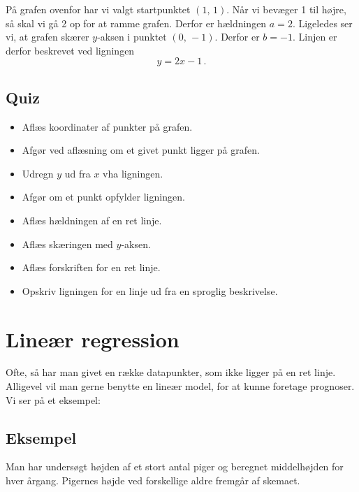 \documentclass[12pt,oneside,a4paper]{article}
\begin{document}
På grafen ovenfor har vi valgt startpunktet $(1,\,1)$. Når vi bevæger
1 til højre, så skal vi gå 2 op for at ramme grafen. Derfor er hældningen $a=2$.
Ligeledes ser vi, at grafen skærer $y$-aksen i punktet $(0,\,-1)$. Derfor er
$b=-1$.
Linjen er derfor beskrevet ved ligningen
\[
    y=2x-1\,.
\]


%


\subsection{Quiz}
\begin{itemize}
    \item Aflæs koordinater af punkter på grafen.
    \item Afgør ved aflæsning om et givet punkt ligger på grafen.
    \item Udregn $y$ ud fra $x$ vha ligningen.
    \item Afgør om et punkt opfylder ligningen.
    \item Aflæs hældningen af en ret linje.
    \item Aflæs skæringen med $y$-aksen.
    \item Aflæs forskriften for en ret linje.
    \item Opskriv ligningen for en linje ud fra en sproglig beskrivelse.
\end{itemize}



\section{Lineær regression}
Ofte, så har man givet en række datapunkter, som ikke ligger på en ret linje. Alligevel
vil man gerne benytte en lineær model, for at kunne foretage prognoser. Vi ser
på et eksempel:

\subsection{Eksempel}
Man har undersøgt højden af et stort antal piger og beregnet middel\-høj\-den for
hver årgang. Pigernes højde ved forskellige aldre fremgår af skemaet.
\end{document}
